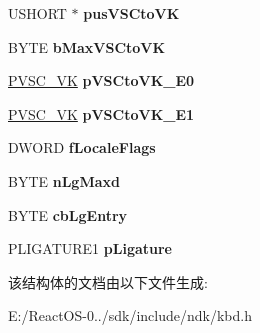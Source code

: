 \begin{DoxyCompactItemize}
U\+S\+H\+O\+RT $\ast$ {\bfseries pus\+V\+S\+Cto\+VK}
\item 
\mbox{\label{struct___k_b_d_t_a_b_l_e_s_a35c01e59b364147ac49523c809b26a94}} 
B\+Y\+TE {\bfseries b\+Max\+V\+S\+Cto\+VK}
\item 
\mbox{\label{struct___k_b_d_t_a_b_l_e_s_a9dbc4d9eafaf2d09972fdf2ee50198aa}} 
\hyperlink{struct___v_s_c___v_k}{P\+V\+S\+C\+\_\+\+VK} {\bfseries p\+V\+S\+Cto\+V\+K\+\_\+\+E0}
\item 
\mbox{\label{struct___k_b_d_t_a_b_l_e_s_ad17bb1e354687c94e3c9e537fa39c864}} 
\hyperlink{struct___v_s_c___v_k}{P\+V\+S\+C\+\_\+\+VK} {\bfseries p\+V\+S\+Cto\+V\+K\+\_\+\+E1}
\item 
\mbox{\label{struct___k_b_d_t_a_b_l_e_s_a973be07371ab234f3bc26fe6e373c3ad}} 
D\+W\+O\+RD {\bfseries f\+Locale\+Flags}
\item 
\mbox{\label{struct___k_b_d_t_a_b_l_e_s_a4a506fe8616e26517d62678be08df8bc}} 
B\+Y\+TE {\bfseries n\+Lg\+Maxd}
\item 
\mbox{\label{struct___k_b_d_t_a_b_l_e_s_aafbc6c304578d9f8a2634dc74217e870}} 
B\+Y\+TE {\bfseries cb\+Lg\+Entry}
\item 
\mbox{\label{struct___k_b_d_t_a_b_l_e_s_a32755760626b44f0d5c9a66278f9a669}} 
P\+L\+I\+G\+A\+T\+U\+R\+E1 {\bfseries p\+Ligature}
\end{DoxyCompactItemize}


该结构体的文档由以下文件生成\+:\begin{DoxyCompactItemize}
\item 
E\+:/\+React\+O\+S-\/0../sdk/include/ndk/kbd.\+h\end{DoxyCompactItemize}
